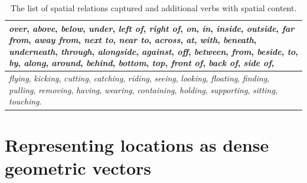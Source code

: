 \begin{table}[hbt]
	\caption{The list of spatial relations captured and additional verbs with spatial content.}\label{sc2020:tab:vocabulary}
	\centering
	\begin{tabular}{|m{30em}|}
		\hline 
		\emph{over},
		\emph{above},
		\emph{below},
		\emph{under},
		\emph{left of},
		\emph{right of},
		\emph{on},
		\emph{in}, 
		\emph{inside},
		\emph{outside},
		\emph{far from}, 
		\emph{away from},
		\emph{next to},
		\emph{near to}, 
		\emph{across},
		\emph{at},
		\emph{with},
		\emph{beneath}, 
		\emph{underneath},
		\emph{through},
		\emph{alongside},
		\emph{against},
		\emph{off}, 
		\emph{between},
		\emph{from},
		\emph{beside}, 
		\emph{to}, 
		\emph{by}, 
		\emph{along}, 
		\emph{around},
		\emph{behind},
		\emph{bottom}, 
		\emph{top},
		\emph{front of},
		\emph{back of},
		\emph{side of}, \\
		\hline
		\emph{flying},
		\emph{kicking},
		\emph{cutting},
		\emph{catching},
		\emph{riding}, 
		\emph{seeing},
		\emph{looking}, 
		\emph{floating}, 
		\emph{finding}, 
		\emph{pulling}, 
		\emph{removing}, 
		\emph{having},
		\emph{wearing},
		\emph{containing}, 
		\emph{holding}, 
		\emph{supporting}, 
		\emph{sitting},
		\emph{touching}. \\
		\hline
	\end{tabular}
\end{table}

\section{Representing locations as dense geometric vectors}\label{sc2020:sec:dense-vectors}


